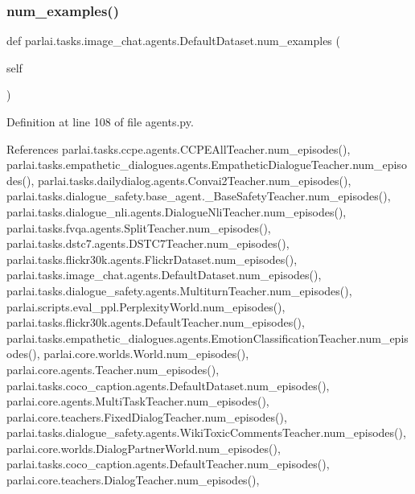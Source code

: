 \subsubsection{\texorpdfstring{num\+\_\+examples()}{num\_examples()}}
{\footnotesize\ttfamily def parlai.\+tasks.\+image\+\_\+chat.\+agents.\+Default\+Dataset.\+num\+\_\+examples (\begin{DoxyParamCaption}\item[{}]{self }\end{DoxyParamCaption})}



Definition at line 108 of file agents.\+py.



References parlai.\+tasks.\+ccpe.\+agents.\+C\+C\+P\+E\+All\+Teacher.\+num\+\_\+episodes(), parlai.\+tasks.\+empathetic\+\_\+dialogues.\+agents.\+Empathetic\+Dialogue\+Teacher.\+num\+\_\+episodes(), parlai.\+tasks.\+dailydialog.\+agents.\+Convai2\+Teacher.\+num\+\_\+episodes(), parlai.\+tasks.\+dialogue\+\_\+safety.\+base\+\_\+agent.\+\_\+\+Base\+Safety\+Teacher.\+num\+\_\+episodes(), parlai.\+tasks.\+dialogue\+\_\+nli.\+agents.\+Dialogue\+Nli\+Teacher.\+num\+\_\+episodes(), parlai.\+tasks.\+fvqa.\+agents.\+Split\+Teacher.\+num\+\_\+episodes(), parlai.\+tasks.\+dstc7.\+agents.\+D\+S\+T\+C7\+Teacher.\+num\+\_\+episodes(), parlai.\+tasks.\+flickr30k.\+agents.\+Flickr\+Dataset.\+num\+\_\+episodes(), parlai.\+tasks.\+image\+\_\+chat.\+agents.\+Default\+Dataset.\+num\+\_\+episodes(), parlai.\+tasks.\+dialogue\+\_\+safety.\+agents.\+Multiturn\+Teacher.\+num\+\_\+episodes(), parlai.\+scripts.\+eval\+\_\+ppl.\+Perplexity\+World.\+num\+\_\+episodes(), parlai.\+tasks.\+flickr30k.\+agents.\+Default\+Teacher.\+num\+\_\+episodes(), parlai.\+tasks.\+empathetic\+\_\+dialogues.\+agents.\+Emotion\+Classification\+Teacher.\+num\+\_\+episodes(), parlai.\+core.\+worlds.\+World.\+num\+\_\+episodes(), parlai.\+core.\+agents.\+Teacher.\+num\+\_\+episodes(), parlai.\+tasks.\+coco\+\_\+caption.\+agents.\+Default\+Dataset.\+num\+\_\+episodes(), parlai.\+core.\+agents.\+Multi\+Task\+Teacher.\+num\+\_\+episodes(), parlai.\+core.\+teachers.\+Fixed\+Dialog\+Teacher.\+num\+\_\+episodes(), parlai.\+tasks.\+dialogue\+\_\+safety.\+agents.\+Wiki\+Toxic\+Comments\+Teacher.\+num\+\_\+episodes(), parlai.\+core.\+worlds.\+Dialog\+Partner\+World.\+num\+\_\+episodes(), parlai.\+tasks.\+coco\+\_\+caption.\+agents.\+Default\+Teacher.\+num\+\_\+episodes(), parlai.\+core.\+teachers.\+Dialog\+Teacher.\+num\+\_\+episodes(), 